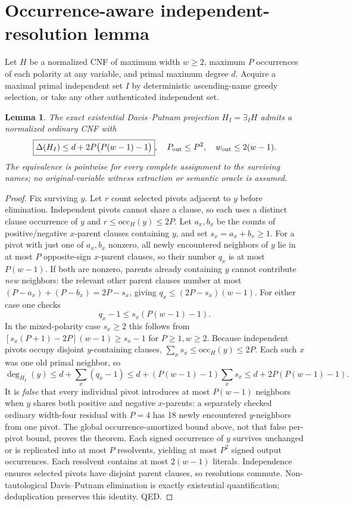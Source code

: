 \documentclass[11pt]{article}
\newtheorem{lemma}{Lemma}\newtheorem{theorem}{Theorem}
\begin{document}
\section{Occurrence-aware independent-resolution lemma}
Let $H$ be a normalized CNF of maximum width $w\ge2$, maximum $P$ occurrences of each polarity at any variable, and primal maximum degree $d$. Acquire a maximal primal independent set $I$ by deterministic ascending-name greedy selection, or take any other authenticated independent set.
\begin{lemma}
The exact existential Davis--Putnam projection $H_I=\exists_I H$ admits a normalized ordinary CNF with
\[
\boxed{\Delta(H_I)\le d+2P\bigl(P(w-1)-1\bigr)},\quad
P_{\rm out}\le P^2,\quad
w_{\rm out}\le2(w-1).
\]
The equivalence is pointwise for every complete assignment to the surviving names; no original-variable witness extraction or semantic oracle is assumed.
\end{lemma}
\begin{proof}
Fix surviving $y$. Let $r$ count selected pivots adjacent to $y$ before elimination. Independent pivots cannot share a clause, so each uses a distinct clause occurrence of $y$ and $r\le \mathrm{occ}_H(y)\le2P$. Let $a_x,b_x$ be the counts of positive/negative $x$-parent clauses containing $y$, and set $s_x=a_x+b_x\ge1$. For a pivot with just one of $a_x,b_x$ nonzero, all newly encountered neighbors of $y$ lie in at most $P$ opposite-sign $x$-parent clauses, so their number $q_x$ is at most $P(w-1)$. If both are nonzero, parents already containing $y$ cannot contribute \emph{new} neighbors: the relevant other parent clauses number at most $(P-a_x)+(P-b_x)=2P-s_x$, giving $q_x\le(2P-s_x)(w-1)$. For either case one checks
\[
q_x-1\le s_x(P(w-1)-1).
\]
In the mixed-polarity case $s_x\ge2$ this follows from
$[s_x(P+1)-2P](w-1)\ge s_x-1$ for $P\ge1,w\ge2$.
Because independent pivots occupy disjoint $y$-containing clauses, $\sum_xs_x\le\mathrm{occ}_H(y)\le2P$. Each such $x$ was one old primal neighbor, so
\[
\deg_{H_I}(y)\le d+\sum_x(q_x-1)
\le d+(P(w-1)-1)\sum_x s_x
\le d+2P(P(w-1)-1).
\]
It is \emph{false} that every individual pivot introduces at most $P(w-1)$ neighbors when $y$ shares both positive and negative $x$-parents: a separately checked ordinary width-four residual with $P=4$ has 18 newly encountered $y$-neighbors from one pivot. The global occurrence-amortized bound above, not that false per-pivot bound, proves the theorem.
Each signed occurrence of $y$ survives unchanged or is replicated into at most $P$ resolvents, yielding at most $P^2$ signed output occurrences. Each resolvent contains at most $2(w-1)$ literals. Independence ensures selected pivots have disjoint parent clauses, so resolutions commute. Non-tautological Davis--Putnam elimination is exactly existential quantification; deduplication preserves this identity. QED.
\end{proof}
\end{document}
